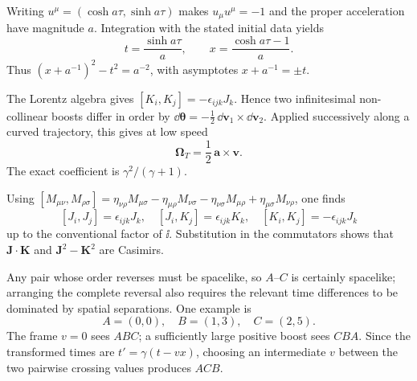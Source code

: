 \begin{solutions}
\begin{solution}
Writing \(u^\mu=(\cosh a\tau,\sinh a\tau)\) makes
\(u_\mu u^\mu=-1\) and the proper acceleration have magnitude \(a\).
Integration with the stated initial data yields
\[
t=\frac{\sinh a\tau}{a},\qquad
x=\frac{\cosh a\tau-1}{a}.
\]
Thus \((x+a^{-1})^2-t^2=a^{-2}\), with asymptotes
\(x+a^{-1}=\pm t\).
\end{solution}

\begin{solution}
The Lorentz algebra gives
\([K_i,K_j]=-\epsilon_{ijk}J_k\).  Hence two infinitesimal non-collinear boosts
differ in order by
\(\dd\bm\theta=-\tfrac12\,\dd\bm v_1\times\dd\bm v_2\).
Applied successively along a curved trajectory, this gives at low speed
\[
\bm\Omega_T=\frac12\,\bm a\times\bm v.
\]
The exact coefficient is
\(\gamma^2/(\gamma+1)\).
\end{solution}

\begin{solution}
Using
\([M_{\mu\nu},M_{\rho\sigma}]
=\eta_{\nu\rho}M_{\mu\sigma}-\eta_{\mu\rho}M_{\nu\sigma}
-\eta_{\nu\sigma}M_{\mu\rho}+\eta_{\mu\sigma}M_{\nu\rho}\),
one finds
\[
[J_i,J_j]=\epsilon_{ijk}J_k,\quad
[J_i,K_j]=\epsilon_{ijk}K_k,\quad
[K_i,K_j]=-\epsilon_{ijk}J_k
\]
up to the conventional factor of \(\ii\).  Substitution in the commutators
shows that \(\bm J\cdot\bm K\) and
\(\bm J^2-\bm K^2\) are Casimirs.
\end{solution}

\begin{solution}
Any pair whose order reverses must be spacelike, so \(A\)--\(C\) is certainly
spacelike; arranging the complete reversal also requires the relevant time
differences to be dominated by spatial separations.  One example is
\[
A=(0,0),\quad B=(1,3),\quad C=(2,5).
\]
The frame \(v=0\) sees \(ABC\); a sufficiently large positive boost sees
\(CBA\).  Since the transformed times are
\(t'=\gamma(t-vx)\), choosing an intermediate \(v\) between the two pairwise
crossing values produces \(ACB\).
\end{solution}



\end{solutions}
